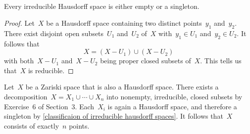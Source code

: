 \subsection{}

\begin{lemma}
	\label{classificaion of irreducible hausdorff spaces}
	Every irreducible Hausdorff space is either empty or a singleton.
\end{lemma}

\begin{proof}
	Let~$X$ be a Hausdorff space containing two distinct points~$y_1$ and~$y_2$.
	There exist disjoint open subsets~$U_1$ and~$U_2$ of~$X$ with~$y_1 ∈ U_1$ and~$y_2 ∈ U_2$.
	It follows that
	\[
		X = (X - U_1) ∪ (X - U_2)
	\]
	with both~$X - U_1$ and~$X - U_2$ being proper closed subsets of~$X$.
	This tells us that~$X$ is reducible.
\end{proof}

Let~$X$ be a Zariski space that is also a Hausdorff space.
There exists a decomposition~$X = X_1 ∪ \dotsb ∪ X_n$ into nonempty, irreducible, closed subsets by Exercise 6 of Section 3.
Each~$X_i$ is again a Hausdorff space, and therefore a singleton by \cref{classificaion of irreducible hausdorff spaces}.
It follows that~$X$ consists of exactly~$n$ points.
